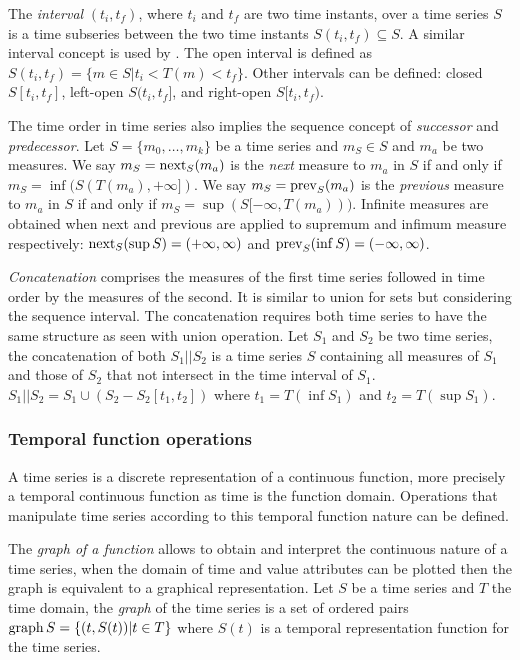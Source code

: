 The \emph{interval} $(t_i,t_f)$, where $t_i$ and $t_f$ are two time
instants, over a time series $S$ is a time subseries between the two
time instants $S(t_i,t_f) \subseteq S$. A similar interval concept
is used by \cite{last:hetland}. The open interval is defined as
$S(t_i,t_f)=\{m\in S | t_i<T(m)<t_f\}$. Other intervals can be
defined: closed $S[t_i,t_f]$, left-open $S(t_i,t_f]$, and right-open
$S[t_i,t_f)$.

The time order in time series also implies the sequence concept of
\emph{successor} and \emph{predecessor}.  Let $S=\{m_0, \ldots, m_k\}$
be a time series and $m_S\in S$ and $m_a$ be two measures. We say
$m_S=\operatorname*{next}_S(m_a)$ is the \emph{next} measure to $m_a$ in $S$ if and
only if $m_S=\inf(S(T(m_a),+\infty])$.  We say $m_S=\operatorname*{prev}_S(m_a)$ is
the \emph{previous} measure to $m_a$ in $S$ if and only if
$m_S=\sup(S[-\infty,T(m_a)))$. %
Infinite measures are obtained when next and previous are applied to
supremum and infimum measure respectively: $\operatorname*{next}_S(\sup
S)=(+\infty,\infty)$ and $\operatorname*{prev}_S(\inf S)=(-\infty,\infty)$.



\emph{Concatenation} comprises the measures of the first time series
followed in time order by the measures of the second. It is similar to
union for sets but considering the sequence interval. The
concatenation requires both time series to have the same structure as
seen with union operation.  Let $S_1$ and $S_2$ be two time series,
the concatenation of both $S_1 || S_2$ is a time series $S$ containing
all measures of $S_1$ and those of $S_2$ that not intersect in the
time interval of $S_1$.  $S_1 || S_2 = S_1 \cup ( S_2 - S_2[t_1,t_2]
)$ where $t_1=T(\inf S_1)$ and $t_2=T(\sup S_1)$.


\subsubsection{Temporal function operations}
A time series is a discrete representation of a continuous function,
more precisely a temporal continuous function as time is the function
domain. Operations that manipulate time series according to this
temporal function nature can be defined.

The \emph{graph of a function} allows to obtain and interpret the
continuous nature of a time series, when the domain of time and value
attributes can be plotted then the graph is equivalent to a graphical
representation.  Let $S$ be a time series and $T$ the time domain, the
\emph{graph} of the time series is a set of ordered pairs $\operatorname*{graph} S =
\{ (t,S(t)) | t\in T \}$ where $S(t)$ is a temporal representation
function for the time series.

